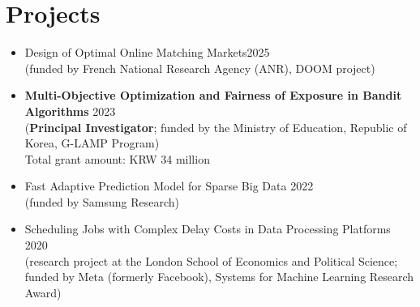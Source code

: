 
\section{Projects}

\begin{itemize}[nosep, wide=0pt]

\item \small Design of Optimal Online Matching Markets\hfill 2025\\ \hspace{5mm}(funded by   French National Research Agency (ANR), DOOM project)
\item \small
\textbf{Multi-Objective Optimization and Fairness of Exposure in 
Bandit Algorithms}
\hfill 2023\\
\hspace{5mm}
(\textbf{Principal Investigator}; funded by the Ministry of Education,
Republic of Korea, G-LAMP Program)\\
\hspace{5mm}
Total grant amount: KRW 34 million
\end{itemize}
\begin{itemize}[nosep, wide=0pt]
    \item \small Fast Adaptive Prediction Model for Sparse Big Data \hfill 2022\\ \hspace{5mm}(funded by Samsung Research)

\end{itemize}
\begin{itemize}[nosep, wide=0pt]
    \item \small
Scheduling Jobs with Complex Delay Costs in Data Processing Platforms
\hfill 2020\\
\hspace{5mm}
(research project at the London School of Economics and Political Science;\\
\hspace{5mm}
funded by Meta (formerly Facebook), Systems for Machine Learning Research Award)
\end{itemize}
